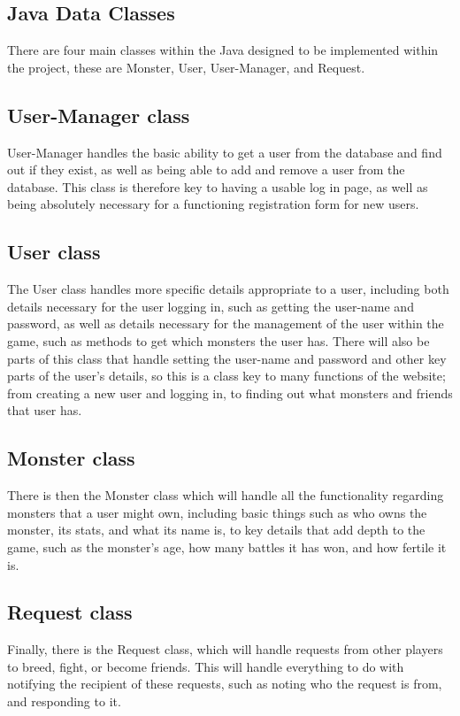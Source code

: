 \documentclass{project}
\begin{document}
\subsection{Java Data Classes}
There are four main classes within the Java designed to be implemented within the project, these are Monster, User, User-Manager, and Request.
\subsection{User-Manager class}
User-Manager handles the basic ability to get a user from the database and find out if they exist, as well as being able to add and remove a user from the database. This class is therefore key to having a usable log in page, as well as being absolutely necessary for a functioning registration form for new users.
\subsection{User class}
The User class handles more specific details appropriate to a user, including both details necessary for the user logging in, such as getting the user-name and password, as well as details necessary for the management of the user within the game, such as methods to get which monsters the user has. There will also be parts of this class that handle setting the user-name and password and other key parts of the user’s details, so this is a class key to many functions of the website; from creating a new user and logging in, to finding out what monsters and friends that user has.
\subsection{Monster class}
There is then the Monster class which will handle all the functionality regarding monsters that a user might own, including basic things such as who owns the monster, its stats, and what its name is, to key details that add depth to the game, such as the monster’s age, how many battles it has won, and how fertile it is.
\subsection{Request class}
Finally, there is the Request class, which will handle requests from other players to breed, fight, or become friends. This will handle everything to do with notifying the recipient of these requests, such as noting who the request is from, and responding to it.
\end{document}
